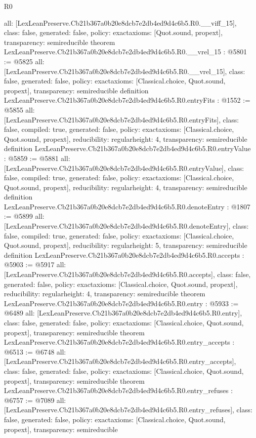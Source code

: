\begin{lexlean}{R0}
\begin{coremodule}
{  all: [LexLeanPreserve.Cb21b367a0b20e8dcb7e2db4ed9d4c6b5.R0.__viff_15],
  class: false,
  generated: false,
  policy: exact{axioms: [Quot.sound, propext]},
  transparency: semireducible
}
theorem LexLeanPreserve.Cb21b367a0b20e8dcb7e2db4ed9d4c6b5.R0.__vrel_15 : @5801 := @5825 {
  all: [LexLeanPreserve.Cb21b367a0b20e8dcb7e2db4ed9d4c6b5.R0.__vrel_15],
  class: false,
  generated: false,
  policy: exact{axioms: [Classical.choice, Quot.sound, propext]},
  transparency: semireducible
}
definition LexLeanPreserve.Cb21b367a0b20e8dcb7e2db4ed9d4c6b5.R0.entryFits : @1552 := @5855 {
  all: [LexLeanPreserve.Cb21b367a0b20e8dcb7e2db4ed9d4c6b5.R0.entryFits],
  class: false,
  compiled: true,
  generated: false,
  policy: exact{axioms: [Classical.choice, Quot.sound, propext]},
  reducibility: regular{height: 4},
  transparency: semireducible
}
definition LexLeanPreserve.Cb21b367a0b20e8dcb7e2db4ed9d4c6b5.R0.entryValue : @5859 := @5881 {
  all: [LexLeanPreserve.Cb21b367a0b20e8dcb7e2db4ed9d4c6b5.R0.entryValue],
  class: false,
  compiled: true,
  generated: false,
  policy: exact{axioms: [Classical.choice, Quot.sound, propext]},
  reducibility: regular{height: 4},
  transparency: semireducible
}
definition LexLeanPreserve.Cb21b367a0b20e8dcb7e2db4ed9d4c6b5.R0.denoteEntry : @1807 := @5899 {
  all: [LexLeanPreserve.Cb21b367a0b20e8dcb7e2db4ed9d4c6b5.R0.denoteEntry],
  class: false,
  compiled: true,
  generated: false,
  policy: exact{axioms: [Classical.choice, Quot.sound, propext]},
  reducibility: regular{height: 5},
  transparency: semireducible
}
definition LexLeanPreserve.Cb21b367a0b20e8dcb7e2db4ed9d4c6b5.R0.accepts : @5903 := @5917 {
  all: [LexLeanPreserve.Cb21b367a0b20e8dcb7e2db4ed9d4c6b5.R0.accepts],
  class: false,
  generated: false,
  policy: exact{axioms: [Classical.choice, Quot.sound, propext]},
  reducibility: regular{height: 4},
  transparency: semireducible
}
theorem LexLeanPreserve.Cb21b367a0b20e8dcb7e2db4ed9d4c6b5.R0.entry : @5933 := @6489 {
  all: [LexLeanPreserve.Cb21b367a0b20e8dcb7e2db4ed9d4c6b5.R0.entry],
  class: false,
  generated: false,
  policy: exact{axioms: [Classical.choice, Quot.sound, propext]},
  transparency: semireducible
}
theorem LexLeanPreserve.Cb21b367a0b20e8dcb7e2db4ed9d4c6b5.R0.entry_accepts : @6513 := @6748 {
  all: [LexLeanPreserve.Cb21b367a0b20e8dcb7e2db4ed9d4c6b5.R0.entry_accepts],
  class: false,
  generated: false,
  policy: exact{axioms: [Classical.choice, Quot.sound, propext]},
  transparency: semireducible
}
theorem LexLeanPreserve.Cb21b367a0b20e8dcb7e2db4ed9d4c6b5.R0.entry_refuses : @6757 := @7089 {
  all: [LexLeanPreserve.Cb21b367a0b20e8dcb7e2db4ed9d4c6b5.R0.entry_refuses],
  class: false,
  generated: false,
  policy: exact{axioms: [Classical.choice, Quot.sound, propext]},
  transparency: semireducible
}


\end{coremodule}
\end{lexlean}
